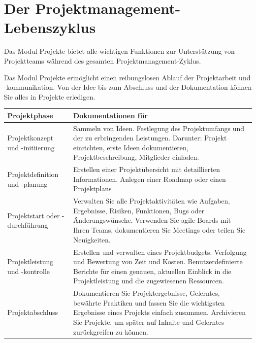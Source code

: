 \documentclass[
  letterpaper,
  DIV=11,
  numbers=noendperiod]{scrreprt}
\begin{document}
\section{Der
Projektmanagement-Lebenszyklus}\label{der-projektmanagement-lebenszyklus}

Das Modul Projekte bietet alle wichtigen Funktionen zur Unterstützung
von Projektteams während des gesamten Projektmanagement-Zyklus.

Das Modul Projekte ermöglicht einen reibungslosen Ablauf der
Projektarbeit und -kommunikation. Von der Idee bis zum Abschluss und der
Dokumentation können Sie alles in Projekte erledigen.

\begin{longtable}[]{@{}
  >{\raggedright\arraybackslash}p{}
  >{\raggedright\arraybackslash}p{}@{}}
\toprule\noalign{}
\begin{minipage}[b]{\linewidth}\raggedright
Projektphase
\end{minipage} & \begin{minipage}[b]{\linewidth}\raggedright
Dokumentationen für
\end{minipage} \\
\midrule\noalign{}
\endhead
\bottomrule\noalign{}
\endlastfoot
Projektkonzept und -initiierung & Sammeln von Ideen. Festlegung des
Projektumfangs und der zu erbringenden Leistungen. Darunter: Projekt
einrichten, erste Ideen dokumentieren, Projektbeschreibung, Mitglieder
einladen. \\
Projektdefinition und -planung & Erstellen einer Projektübersicht mit
detaillierten Informationen. Anlegen einer Roadmap oder einen
Projektplans \\
Projektstart oder -durchführung & Verwalten Sie alle Projektaktivitäten
wie Aufgaben, Ergebnisse, Risiken, Funktionen, Bugs oder
Änderungswünsche. Verwenden Sie agile Boards mit Ihren Teams,
dokumentieren Sie Meetings oder teilen Sie Neuigkeiten. \\
Projektleistung und -kontrolle & Erstellen und verwalten eines
Projektbudgets. Verfolgung und Bewertung von Zeit und Kosten.
Benutzerdefinierte Berichte für einen genauen, aktuellen Einblick in die
Projektleistung und die zugewiesenen Ressourcen. \\
Projektabschluss & Dokumentieren Sie Projektergebnisse, Gelerntes,
bewährte Praktiken und fassen Sie die wichtigsten Ergebnisse eines
Projekts einfach zusammen. Archivieren Sie Projekte, um später auf
Inhalte und Gelerntes zurückgreifen zu können. \\
\end{longtable}
\end{document}
